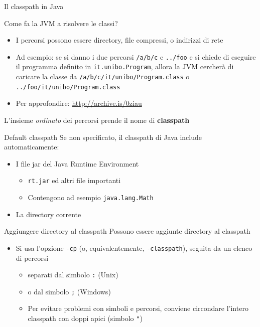 \documentclass[xcolor=dvipsnames,presentation]{beamer}
\begin{document}
\begin{frame}[allowframebreaks]{Il classpath in Java}
\begin{block}{Come fa la JVM a risolvere le classi?}
\begin{itemize}
            \item I percorsi possono essere directory, file compressi, o indirizzi di rete
            \item Ad esempio: se si danno i due percorsi \texttt{\color{red}/a/b/c} e \texttt{\color{blue}../foo} e si chiede di eseguire il programma definito in \texttt{{\color{black!40!green}it.unibo.}{\color{orange}Program}}, allora la JVM cercherà di caricare la classe da \texttt{{\color{red}/a/b/c/}{\color{black!40!green}it/unibo/}{\color{orange}Program}.class} o \texttt{{\color{blue}../foo/}{\color{black!40!green}it/unibo/}{\color{orange}Program}.class}
            \item Per approfondire: \url{http://archive.is/0ziau}
        \end{itemize}
    \end{block}
    \begin{center}
        L'insieme \emph{ordinato} dei percorsi prende il nome di \textbf{classpath}
    \end{center}
    \begin{block}{Default classpath}
        Se non specificato, il classpath di Java include automaticamente:
        \begin{itemize}
            \item I file jar del Java Runtime Environment
            \begin{itemize}
                \item \texttt{rt.jar} ed altri file importanti
                \item Contengono ad esempio \texttt{java.lang.Math}
            \end{itemize}
            \item La directory corrente
        \end{itemize}
    \end{block}
    \begin{block}{Aggiungere directory al classpath}
        Possono essere aggiunte directory al classpath
        \begin{itemize}
            \item Si usa l'opzione \texttt{-cp} (o, equivalentemente, \texttt{-classpath}), seguita da un elenco di percorsi
            \begin{itemize}
                \item separati dal simbolo \texttt{:} (Unix)
                \item o dal simbolo \texttt{;} (Windows)
                \item Per evitare problemi con simboli e percorsi, conviene circondare l'intero classpath con doppi apici (simbolo \texttt{"})
            \end{itemize}
        \end{itemize}
    \end{block}
\end{frame}
\end{document}
